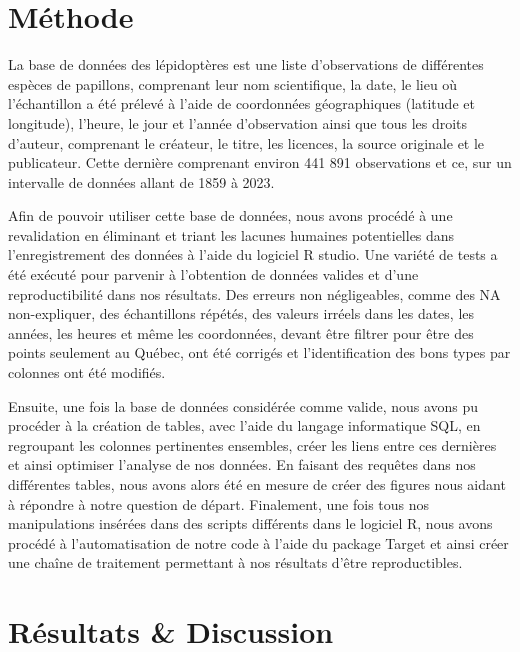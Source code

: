 \documentclass[9pt,twocolumn,twoside,]{pnas-new}
\begin{document}
\section*{Méthode}\label{muxe9thode}

La base de données des lépidoptères est une liste d'observations de
différentes espèces de papillons, comprenant leur nom scientifique, la
date, le lieu où l'échantillon a été prélevé à l'aide de coordonnées
géographiques (latitude et longitude), l'heure, le jour et l'année
d'observation ainsi que tous les droits d'auteur, comprenant le
créateur, le titre, les licences, la source originale et le publicateur.
Cette dernière comprenant environ 441 891 observations et ce, sur un
intervalle de données allant de 1859 à 2023.

Afin de pouvoir utiliser cette base de données, nous avons procédé à une
revalidation en éliminant et triant les lacunes humaines potentielles
dans l'enregistrement des données à l'aide du logiciel R studio. Une
variété de tests a été exécuté pour parvenir à l'obtention de données
valides et d'une reproductibilité dans nos résultats. Des erreurs non
négligeables, comme des NA non-expliquer, des échantillons répétés, des
valeurs irréels dans les dates, les années, les heures et même les
coordonnées, devant être filtrer pour être des points seulement au
Québec, ont été corrigés et l'identification des bons types par colonnes
ont été modifiés.

Ensuite, une fois la base de données considérée comme valide, nous avons
pu procéder à la création de tables, avec l'aide du langage informatique
SQL, en regroupant les colonnes pertinentes ensembles, créer les liens
entre ces dernières et ainsi optimiser l'analyse de nos données. En
faisant des requêtes dans nos différentes tables, nous avons alors été
en mesure de créer des figures nous aidant à répondre à notre question
de départ. Finalement, une fois tous nos manipulations insérées dans des
scripts différents dans le logiciel R, nous avons procédé à
l'automatisation de notre code à l'aide du package Target et ainsi créer
une chaîne de traitement permettant à nos résultats d'être
reproductibles.

\section*{Résultats \& Discussion}\label{ruxe9sultats-discussion}
\end{document}
